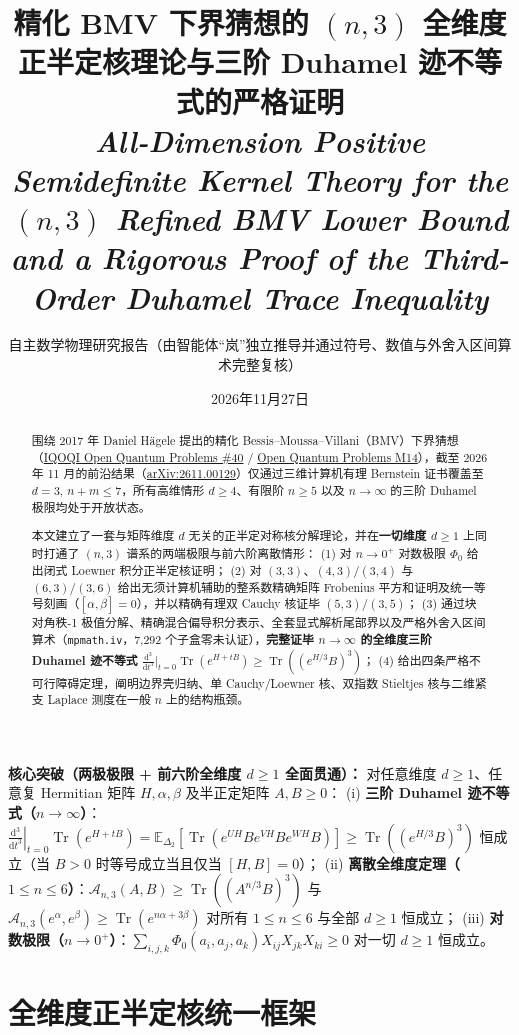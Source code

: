 \documentclass[11pt,a4paper]{article}
\title{\textbf{\color{primary}精化 BMV 下界猜想的 $(n,3)$ 全维度正半定核理论与三阶 Duhamel 迹不等式的严格证明}\\[4pt]
\large\textit{All-Dimension Positive Semidefinite Kernel Theory for the $(n,3)$ Refined BMV Lower Bound and a Rigorous Proof of the Third-Order Duhamel Trace Inequality}}
\author{自主数学物理研究报告（由智能体“岚”独立推导并通过符号、数值与外舍入区间算术完整复核）}
\date{2026年11月27日}
\theoremstyle{remark}
\newcommand{\Tr}{\operatorname{Tr}}
\newcommand{\takeaway}[2]{%
  \vspace{5pt}\noindent\colorbox{primary!8}{%
    \parbox{\dimexpr\linewidth-2\fboxsep\relax}{%
      \vspace{4pt}\textbf{\color{primary}#1：}\hspace{0.4em}#2\vspace{4pt}%
    }%
  }\vspace{5pt}%
}
\begin{document}
\maketitle

\begin{abstract}
围绕 2017 年 Daniel H\"agele 提出的精化 Bessis--Moussa--Villani（BMV）下界猜想（\href{https://oqp.iqoqi.oeaw.ac.at/open-quantum-problems}{IQOQI Open Quantum Problems \#40} / \href{https://openquantumproblems.com/p/M14}{Open Quantum Problems M14}），截至 2026 年 11 月的前沿结果（\href{https://arxiv.org/html/2611.00129v1}{arXiv:2611.00129}）仅通过三维计算机有理 Bernstein 证书覆盖至 $d=3,\, n+m\le 7$，所有高维情形 $d\ge 4$、有限阶 $n\ge 5$ 以及 $n\to\infty$ 的三阶 Duhamel 极限均处于开放状态。

本文建立了一套与矩阵维度 $d$ 无关的正半定对称核分解理论，并在\textbf{一切维度 $d\ge 1$} 上同时打通了 $(n,3)$ 谱系的两端极限与前六阶离散情形：
(1) 对 $n\to 0^+$ 对数极限 $\Phi_0$ 给出闭式 Loewner 积分正半定核证明；
(2) 对 $(3,3)$、$(4,3)/(3,4)$ 与 $(6,3)/(3,6)$ 给出无须计算机辅助的整系数精确矩阵 Frobenius 平方和证明及统一等号刻画（$[\alpha,\beta]=0$），并以精确有理双 Cauchy 核证毕 $(5,3)/(3,5)$；
(3) 通过块对角秩-1 极值分解、精确混合偏导积分表示、全套显式解析尾部界以及严格外舍入区间算术（\texttt{mpmath.iv}，7,292 个子盒零未认证），\textbf{完整证毕 $n\to\infty$ 的全维度三阶 Duhamel 迹不等式} $\frac{\mathrm{d}^3}{\mathrm{d}t^3}\big|_{t=0}\Tr(e^{H+tB}) \ge \Tr((e^{H/3}B)^3)$；
(4) 给出四条严格不可行障碍定理，阐明边界壳归纳、单 Cauchy/Loewner 核、双指数 Stieltjes 核与二维紧支 Laplace 测度在一般 $n$ 上的结构瓶颈。
\end{abstract}

\takeaway{核心突破（两极极限 + 前六阶全维度 $d\ge 1$ 全面贯通）}{
对任意维度 $d \ge 1$、任意复 Hermitian 矩阵 $H, \alpha, \beta$ 及半正定矩阵 $A, B \ge 0$：
(i) \textbf{三阶 Duhamel 迹不等式（$n\to\infty$）}：$\left.\frac{\mathrm{d}^3}{\mathrm{d}t^3}\right|_{t=0}\Tr(e^{H+tB}) = \mathbb{E}_{\Delta_2}[\Tr(e^{UH}Be^{VH}Be^{WH}B)] \ge \Tr((e^{H/3}B)^3)$ 恒成立（当 $B>0$ 时等号成立当且仅当 $[H,B]=0$）；
(ii) \textbf{离散全维度定理（$1\le n\le 6$）}：$\mathcal{A}_{n,3}(A,B)\ge\Tr((A^{n/3}B)^3)$ 与 $\mathcal{A}_{n,3}(e^\alpha,e^\beta)\ge\Tr(e^{n\alpha+3\beta})$ 对所有 $1\le n\le 6$ 与全部 $d\ge 1$ 恒成立；
(iii) \textbf{对数极限（$n\to 0^+$）}：$\sum_{i,j,k}\Phi_0(a_i,a_j,a_k)X_{ij}X_{jk}X_{ki}\ge 0$ 对一切 $d\ge 1$ 恒成立。}

\section{全维度正半定核统一框架}
\end{document}

